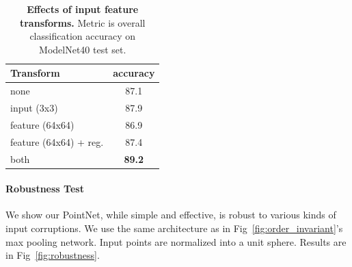 \begin{table}[b!]
    \small
    \centering
    \begin{tabular}[width=\linewidth]{l|c}
    \hline
    Transform              & accuracy \\ \hline
    none                   & 87.1     \\ \hline
    input (3x3)            & 87.9     \\
    feature (64x64)        & 86.9     \\
    feature (64x64) + reg. & 87.4     \\ \hline
    both                   & \textbf{89.2}     \\ \hline
    \end{tabular}
    \caption{\textbf{Effects of input feature transforms.} Metric is overall classification accuracy on ModelNet40 test set.}
    \label{tab:transform}
\end{table}




\paragraph{Robustness Test} We show our PointNet, while simple and effective, is robust to various kinds of input corruptions. We use the same architecture as in Fig~\ref{fig:order_invariant}'s max pooling network. Input points are normalized into a unit sphere. Results are in Fig~\ref{fig:robustness}.


